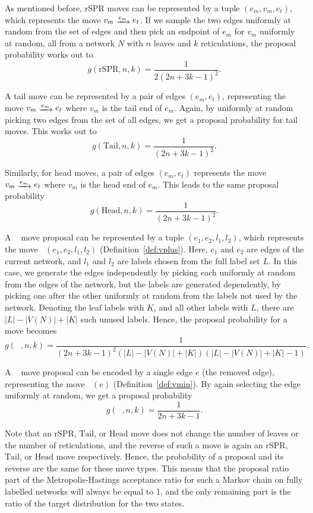 \documentclass{article}
\theoremstyle{definition}
\newcommand{\move}[1]{\mathrel{\raisebox{-2pt}{$\xrightarrow{#1}$}}}
\DeclareMathOperator{\VM}{Vert^{--}}
\DeclareMathOperator{\VP}{Vert^+}
\newcommand{\Tail}{\mathrm{Tail}}
\newcommand{\Head}{\mathrm{Head}}
\newcommand{\rSPR}{\mathrm{rSPR}}
\begin{document}
As mentioned before, $\rSPR$ moves can be represented by a tuple $(e_m, v_m, e_t)$, which represents the move $v_m\move{e_m} e_t$. If we sample the two edges uniformly at random from the set of edges and then pick an endpoint of $e_m$ for $v_m$ uniformly at random, all from a network $N$ with $n$ leaves and $k$ reticulations, the proposal probability works out to 
\[g(\rSPR, n,k) = \frac{1}{2(2n+3k-1)^2}.\]

A tail move can be represented by a pair of edges $(e_m, e_t)$, representing the move $v_m\move{e_m} e_t$ where $v_m$ is the tail end of $e_m$. Again, by uniformly at random picking two edges from the set of all edges, we get a proposal probability for tail moves. This works out to 
\[g(\Tail, n,k) = \frac{1}{(2n+3k-1)^2}.\] 

Similarly, for head moves, a pair of edges $(e_m, e_t)$ represents the move $v_m\move{e_m} e_t$ where $v_m$ is the head end of $e_m$. This leads to the same proposal probability 
\[g(\Head, n,k) = \frac{1}{(2n+3k-1)^2}.\]

A $\VP$ move proposal can be represented by a tuple $(e_1, e_2, l_1, l_2)$, which represents the move $\VP(e_1,e_2,l_1,l_2)$ (Definition~\ref{def:vplus}). Here, $e_1$ and $e_2$ are edges of the current network, and $l_1$ and $l_2$ are labels chosen from the full label set $L$. In this case, we generate the edges independently by picking each uniformly at random from the edges of the network, but the labels are generated dependently, by picking one after the other uniformly at random from the labels not used by the network. 
Denoting the leaf labels with $K$, and all other labels with $L$, there are $|L|-|V(N)|+|K|$ such unused labels.  
Hence, the proposal probability for a $\VP$ move becomes 
\[g(\VP, n,k) = \frac{1}{(2n+3k-1)^2 (|L|-|V(N)|+|K|) (|L|-|V(N)|+|K|-1)}.\]

A $\VM$ move proposal can be encoded by a single edge $e$ (the removed edge), representing the move $\VM(e)$ (Definition~\ref{def:vmin}). By again selecting the edge uniformly at random, we get a proposal probability 
\[g(\VM, n,k) = \frac{1}{2n+3k-1}.\]

Note that an $\rSPR$, $\Tail$, or $\Head$ move does not change the number of leaves or the number of reticulations, and the reverse of such a move is again an $\rSPR$, $\Tail$, or $\Head$ move respectively. Hence, the probability of a proposal and its reverse are the same for these move types. This means that the proposal ratio part of the Metropolis-Hastings acceptance ratio for such a Markov chain on fully labelled networks will always be equal to 1, and the only remaining part is the ratio of the target distribution for the two states. 
\end{document}
